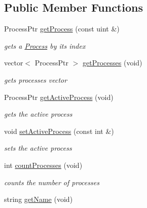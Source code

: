 \subsection*{Public Member Functions}
\begin{DoxyCompactItemize}
\item 
Process\+Ptr \hyperlink{classSort_a5b30c6e6f75987a8a10bef36762aace6}{get\+Process} (const uint \&)
\begin{DoxyCompactList}\small\item\em gets a \hyperlink{classProcess}{Process} by its index \end{DoxyCompactList}\item 
\hypertarget{classSort_af4b1feed1cf830292a474110ea478b7d}{vector$<$ Process\+Ptr $>$ \hyperlink{classSort_af4b1feed1cf830292a474110ea478b7d}{get\+Processes} (void)}\label{classSort_af4b1feed1cf830292a474110ea478b7d}

\begin{DoxyCompactList}\small\item\em gets processes vector \end{DoxyCompactList}\item 
\hypertarget{classSort_ad77072a25565d843de3ea6a7b47ffbdd}{Process\+Ptr \hyperlink{classSort_ad77072a25565d843de3ea6a7b47ffbdd}{get\+Active\+Process} (void)}\label{classSort_ad77072a25565d843de3ea6a7b47ffbdd}

\begin{DoxyCompactList}\small\item\em gets the active process \end{DoxyCompactList}\item 
\hypertarget{classSort_afb60d6f4e0b2d2984faf33fe16ad29b2}{void \hyperlink{classSort_afb60d6f4e0b2d2984faf33fe16ad29b2}{set\+Active\+Process} (const int \&)}\label{classSort_afb60d6f4e0b2d2984faf33fe16ad29b2}

\begin{DoxyCompactList}\small\item\em sets the active process \end{DoxyCompactList}\item 
int \hyperlink{classSort_a1f91b39f9d5d05ffbf59a1480102e85c}{count\+Processes} (void)
\begin{DoxyCompactList}\small\item\em counts the number of processes \end{DoxyCompactList}\item 
\hypertarget{classSort_aae171b005c3dada51b7a302230ff501a}{string \hyperlink{classSort_aae171b005c3dada51b7a302230ff501a}{get\+Name} (void)}\label{classSort_aae171b005c3dada51b7a302230ff501a}


\end{DoxyCompactItemize}
